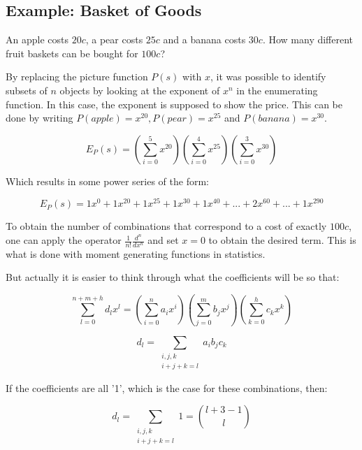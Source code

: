 \subsection{Example: Basket of Goods}

An apple costs $20c$, a pear costs $25c$ and a banana costs $30c$. How many different fruit baskets can be bought for $100c$?

By replacing the picture function $P(s)$ with $x$, it was possible to identify subsets of $n$ objects by looking at the exponent of $x^n$ in the enumerating function. In this case, the exponent is supposed to show the price. This can be done by writing $P(apple) = x^{20}, P(pear) = x^{25}$ and $P(banana) = x^{30}$. 

\begin{equation}
E_P(s) = \left( \sum_{i=0}^5 x^{20} \right)\left( \sum_{i=0}^4 x^{25} \right)\left( \sum_{i=0}^3 x^{30} \right)
\end{equation}

Which results in some power series of the form:

\begin{equation}
E_P(s) = 1x^0 + 1x^{20} + 1x^{25} + 1x^{30} + 1x^{40} +... + 2x^{60} + ... + 1x^{290}
\end{equation}

To obtain the number of combinations that correspond to a cost of exactly $100c$, one can apply the operator $\frac{1}{n!}\frac{d^n}{dx^n}$ and set $x=0$ to obtain the desired term. This is what is done with moment generating functions in statistics. 

But actually it is easier to think through what the coefficients will be so that:

\begin{equation}
\sum_{l=0}^{n+m+h}d_l x^l = \left(\sum_{i=0}^n a_i x^i\right)\left(\sum_{j=0}^m b_j x^j\right)\left(\sum_{k=0}^h c_k x^k\right)
\end{equation}

\begin{equation}
d_l = \sum_{\begin{array}{c}i,j,k\\i+j+k=l\end{array}} a_i b_j c_k
\end{equation}

If the coefficients are all '1', which is the case for these combinations, then:

\begin{equation}
d_l = \sum_{\begin{array}{c}i,j,k\\i+j+k=l\end{array}} 1 = {l + 3 - 1 \choose l}
\end{equation}

